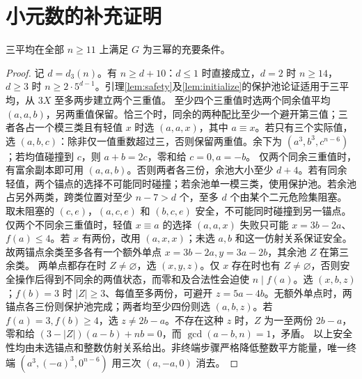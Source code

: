 \section{小元数的补充证明}\label{app:small}
\begin{lemma}\label{lem:triple-large}
三平均在全部 $n\ge11$ 上满足 $G$ 为三幂的充要条件。
\end{lemma}
\begin{proof}
记 $d=d_3(n)$。有 $n\ge d+10$：$d\le1$ 时直接成立，$d=2$ 时 $n\ge14$，$d\ge3$ 时 $n\ge2\cdot5^{d-1}$。引理\ref{lem:safety}及\ref{lem:initialize}的保护池论证适用于三平均，从 $3X$ 至多两步建立两个三重值。
至少四个三重值时选两个同余值平均 $(a,a,b)$，另两重值保留。恰三个时，同余的两种配比至少一个避开第三值；三者各占一个模三类且有轻值 $x$ 时选 $(a,a,x)$，其中 $a\equiv x$。若只有三个实际值，选 $(a,b,c)$：除非仅一值重数超过三，否则保留两重值。余下为 $(a^3,b^3,c^{n-6})$；若均值碰撞到 $c$，则 $a+b=2c$，零和给 $c=0,a=-b$。
仅两个同余三重值时，有富余副本即可用 $(a,a,b)$。否则两者各三份，余池大小至少 $d+4$。若有同余轻值，两个锚点的选择不可能同时碰撞；若余池单一模三类，使用保护池。若余池占另外两类，跨类位置对至少 $n-7>d$ 个，至多 $d$ 个由某个二元危险集阻塞。取未阻塞的 $(c,e)$，$(a,c,e)$ 和 $(b,c,e)$ 安全，不可能同时碰撞到另一锚点。
仅两个不同余三重值时，轻值 $x\equiv a$ 的选择 $(a,a,x)$ 失败只可能 $x=3b-2a$、$f(a)\le4$。若 $x$ 有两份，改用 $(a,x,x)$；未选 $a,b$ 和这一仿射关系保证安全。故两锚点余类至多各有一个额外单点 $x=3b-2a,y=3a-2b$，其余池 $Z$ 在第三余类。
两单点都存在时 $Z\ne\varnothing$，选 $(x,y,z)$。仅 $x$ 存在时也有 $Z\ne\varnothing$，否则安全操作后得到不同余的两值状态，而零和及合法性会迫使 $n\mid f(a)$。选 $(x,b,z)$；$f(b)=3$ 时 $|Z|\ge3$、每值至多两份，可避开 $z=5a-4b$。无额外单点时，两锚点各三份则保护池完成；两者均至少四份则选 $(a,b,z)$。若 $f(a)=3,f(b)\ge4$，选 $z\ne2b-a$。不存在这种 $z$ 时，$Z$ 为一至两份 $2b-a$，零和给 $(3-|Z|)(a-b)+nb=0$，而 $\gcd(a-b,n)=1$，矛盾。
以上安全性均由未选锚点和整数仿射关系给出。非终端步骤严格降低整数平方能量，唯一终端 $(a^3,(-a)^3,0^{n-6})$ 用三次 $(a,-a,0)$ 消去。
\end{proof}

